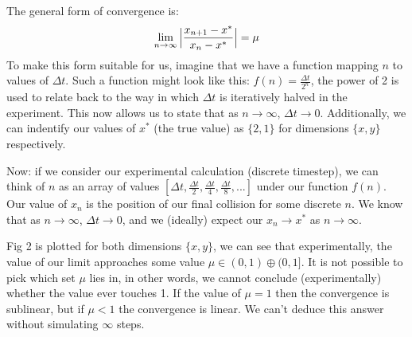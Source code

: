 \documentclass[twoside,11pt]{article}
\begin{document}
\centering
The general form of convergence is:
$$ \lim_{n\rightarrow\infty}{\Bigl|\frac{x_{n+1}-x^*}{x_n-x^*}\Bigr|} = \mu$$
\justifying
To make this form suitable for us, imagine that we have a function mapping $n$ to values of $\Delta t$. Such a function might look like this: $f(n) = \frac{\Delta t}{2^n}$, the power of 2 is used  to relate back to the way in which $\Delta t$ is iteratively halved in the experiment. This now allows us to state that as $n\rightarrow\infty$, $\Delta t\rightarrow0$. Additionally, we can indentify our values of $x^*$ (the true value) as $\{2,1\}$ for dimensions $\{x,y\}$ respectively.

Now: if we consider our experimental calculation (discrete timestep), we can think of $n$ as an array of values $[\Delta t, \frac{\Delta t}{2}, \frac{\Delta t}{4}, \frac{\Delta t}{8}, ...]$ under our function $f(n)$. Our value of $x_n$ is the position of our final collision for some discrete $n$. We know that as $n\rightarrow\infty$, $\Delta t\rightarrow0$, and we (ideally) expect our $x_n\rightarrow x^*$ as $n\rightarrow\infty$.

Fig 2 is plotted for both dimensions $\{x,y\}$, we can see that experimentally, the value of our limit approaches some value $\mu\in(0,1)\oplus(0,1]$. It is not possible to pick which set $\mu$ lies in, in other words, we cannot conclude (experimentally) whether the value ever touches 1. If the value of $\mu=1$ then the convergence is sublinear, but if $\mu<1$ the convergence is linear. We can't deduce this answer without simulating $\infty$ steps.
  
\end{document}
